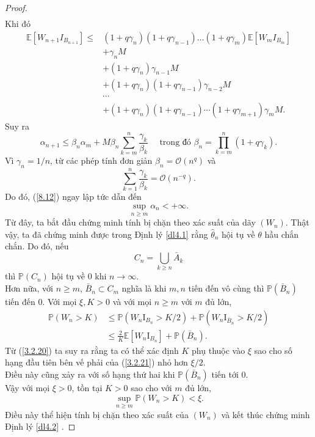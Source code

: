\begin{proof}
$$\begin{aligned}
\end{aligned}
$$
Khi đó
$$
\begin{aligned}
\mathbb{E}\left[W_{n+1} I_{B_{n+1}}\right] \leqslant & \left(1+q \gamma_n\right)\left(1+q \gamma_{n-1}\right) \ldots\left(1+q \gamma_m\right) \mathbb{E}\left[W_m I_{B_m}\right] \\ & +\gamma_n M \\ & +\left(1+q \gamma_n\right) \gamma_{n-1} M \\ & +\left(1+q \gamma_n\right)\left(1+q \gamma_{n-1}\right) \gamma_{n-2} M \\ & \cdots \\ & +\left(1+q \gamma_n\right)\left(1+q \gamma_{n-1}\right) \cdots\left(1+q \gamma_{m+1}\right) \gamma_m M.
\end{aligned}
$$
Suy ra
\begin{equation}
    \alpha_{n+1} \leq \beta_{n} \alpha_{m}+M \beta_{n} \sum_{k=m}^{n} \frac{\gamma_{k}}{\beta_{k}} \quad \text { trong đó } \beta_{n}=\prod_{k=m}^{n}\left(1+q \gamma_{k}\right).
\label{8.12.1}
\end{equation}
Vì $\gamma_{n}=1 / n$, từ các phép tính đơn giản $\beta_{n}=\mathcal{O}\left(n^{q}\right)$ 
và
$$
\sum_{k=1}^{n} \frac{\gamma_{k}}{\beta_{k}}=\mathcal{O}\left(n^{-q}\right).
$$
Do đó, (\ref{8.12}) ngay lập tức dẫn đến
\begin{equation}
    \sup _{n \geq m} \alpha_{n}<+\infty.
\label{3.2.20}
\end{equation}
Từ đây, ta bắt đầu chứng minh tính bị chặn theo xác suất của dãy $\left(W_{n}\right)$. Thật vậy, ta đã chứng minh được trong Định lý \ref{dl4.1} rằng $\widehat{\theta}_{n}$ hội tụ về $\theta$ hầu chắn chắn. Do đó, nếu
$$
C_{n}=\bigcup_{k \geq n} \bar{A}_{k}
$$
thì $\mathbb{P}\left(C_{n}\right)$ hội tụ về 0 khi $n \to \infty$. \\
Hơn nữa, với $n \geq m$, $\bar{B}_{n} \subset C_{m}$ nghĩa là khi $m, n$ tiến đến vô cùng thì $\mathbb{P}\left(\bar{B}_{n}\right)$ tiến đến 0. Với mọi $\xi, K>0$ và với mọi $n \geq m$ với $m$ đủ lớn,
\begin{equation}
    \begin{aligned}
\mathbb{P}\left(W_{n}>K\right) & \leq \mathbb{P}\left(W_{n} \mathrm{I}_{B_{n}}>K / 2\right)+\mathbb{P}\left(W_{n} \mathrm{I}_{\bar{B}_{n}}>K / 2\right) \\
& \leq \frac{2}{K} \mathbb{E}\left[W_{n} \mathrm{I}_{B_{n}}\right]+\mathbb{P}\left(\bar{B}_{n}\right).
\end{aligned}
\label{3.2.21}
\end{equation}
Từ (\ref{3.2.20}) ta suy ra rằng ta có thể xác định $K$ phụ thuộc vào $\xi$ sao cho số hạng đầu tiên bên vế phải của (\ref{3.2.21}) nhỏ hơn $\xi/2$.\\
Điều này cũng xảy ra với số hạng thứ hai khi $\mathbb{P}\left(\bar{B}_{n}\right)$ tiến tới 0.\\
Vậy với mọi $\xi>0$, tồn tại $K>0$ sao cho với $m$ đủ lớn,
$$
\sup _{n \geq m} \mathbb{P}\left(W_{n}>K\right)<\xi.
$$
Điều này thể hiện tính bị chặn theo xác suất của $\left(W_{n}\right)$ và kết thúc chứng minh Định lý \ref{dl4.2} .
\end{proof}
